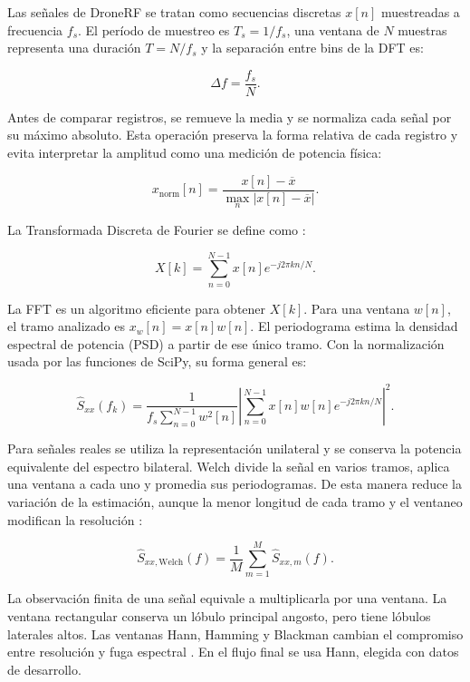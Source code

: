 \documentclass[11pt,a4paper]{article}
\begin{document}
Las señales de DroneRF se tratan como secuencias discretas $x[n]$ muestreadas a frecuencia
$f_s$. El período de muestreo es $T_s=1/f_s$, una ventana de $N$ muestras representa una
duración $T=N/f_s$ y la separación entre bins de la DFT es:

\begin{equation}
\Delta f=\frac{f_s}{N}.
\end{equation}

Antes de comparar registros, se remueve la media y se normaliza cada señal por su máximo
absoluto. Esta operación preserva la forma relativa de cada registro y evita interpretar
la amplitud como una medición de potencia física:

\begin{equation}
x_{\mathrm{norm}}[n] = \frac{x[n]-\overline{x}}{\max_n |x[n]-\overline{x}|}.
\end{equation}

La Transformada Discreta de Fourier se define como \cite{oppenheim}:

\begin{equation}
X[k]=\sum_{n=0}^{N-1}x[n]e^{-j2\pi kn/N}.
\end{equation}

La FFT es un algoritmo eficiente para obtener $X[k]$. Para una ventana $w[n]$, el tramo
analizado es $x_w[n]=x[n]w[n]$. El periodograma estima la densidad espectral de potencia
(PSD) a partir de ese único tramo. Con la normalización usada por las funciones de SciPy,
su forma general es:

\begin{equation}
\widehat{S}_{xx}(f_k)=
\frac{1}{f_s\sum_{n=0}^{N-1}w^2[n]}
\left|\sum_{n=0}^{N-1}x[n]w[n]e^{-j2\pi kn/N}\right|^2.
\end{equation}

Para señales reales se utiliza la representación unilateral y se conserva la potencia
equivalente del espectro bilateral. Welch divide la señal en varios tramos, aplica una
ventana a cada uno y promedia sus periodogramas. De esta manera reduce la variación de la
estimación, aunque la menor longitud de cada tramo y el ventaneo modifican la resolución
\cite{welch}:

\begin{equation}
\widehat{S}_{xx,\mathrm{Welch}}(f)=\frac{1}{M}\sum_{m=1}^{M}\widehat{S}_{xx,m}(f).
\end{equation}

La observación finita de una señal equivale a multiplicarla por una ventana. La ventana
rectangular conserva un lóbulo principal angosto, pero tiene lóbulos laterales altos. Las
ventanas Hann, Hamming y Blackman cambian el compromiso entre resolución y fuga espectral
\cite{harris}. En el flujo final se usa Hann, elegida con datos de desarrollo.
\end{document}
